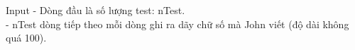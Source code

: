 Input
- Dòng đầu là số lượng test: nTest.
\\- nTest dòng tiếp theo mỗi dòng ghi ra dãy chữ số mà John viết (độ dài không quá 100).